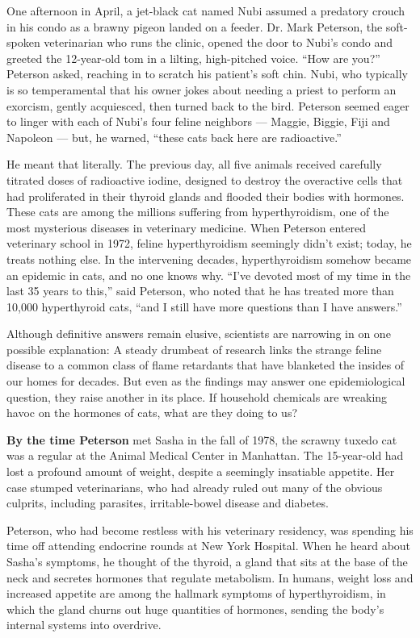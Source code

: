 One afternoon in April, a jet-black cat named Nubi assumed a predatory
crouch in his condo as a brawny pigeon landed on a feeder. Dr. Mark
Peterson, the soft-spoken veterinarian who runs the clinic, opened the
door to Nubi's condo and greeted the 12-year-old tom in a lilting,
high-pitched voice. ``How are you?'' Peterson asked, reaching in to
scratch his patient's soft chin. Nubi, who typically is so temperamental
that his owner jokes about needing a priest to perform an exorcism,
gently acquiesced, then turned back to the bird. Peterson seemed eager
to linger with each of Nubi's four feline neighbors --- Maggie, Biggie,
Fiji and Napoleon --- but, he warned, ``these cats back here are
radioactive.''

He meant that literally. The previous day, all five animals received
carefully titrated doses of radioactive iodine, designed to destroy the
overactive cells that had proliferated in their thyroid glands and
flooded their bodies with hormones. These cats are among the millions
suffering from hyperthyroidism, one of the most mysterious diseases in
veterinary medicine. When Peterson entered veterinary school in 1972,
feline hyperthyroidism seemingly didn't exist; today, he treats nothing
else. In the intervening decades, hyperthyroidism somehow became an
epidemic in cats, and no one knows why. ``I've devoted most of my time
in the last 35 years to this,'' said Peterson, who noted that he has
treated more than 10,000 hyperthyroid cats, ``and I still have more
questions than I have answers.''

Although definitive answers remain elusive, scientists are narrowing in
on one possible explanation: A steady drumbeat of research links the
strange feline disease to a common class of flame retardants that have
blanketed the insides of our homes for decades. But even as the findings
may answer one epidemiological question, they raise another in its
place. If household chemicals are wreaking havoc on the hormones of
cats, what are they doing to us?

\textbf{By the time Peterson} met Sasha in the fall of 1978, the scrawny
tuxedo cat was a regular at the Animal Medical Center in Manhattan. The
15-year-old had lost a profound amount of weight, despite a seemingly
insatiable appetite. Her case stumped veterinarians, who had already
ruled out many of the obvious culprits, including parasites,
irritable-bowel disease and diabetes.

Peterson, who had become restless with his veterinary residency, was
spending his time off attending endocrine rounds at New York Hospital.
When he heard about Sasha's symptoms, he thought of the thyroid, a gland
that sits at the base of the neck and secretes hormones that regulate
metabolism. In humans, weight loss and increased appetite are among the
hallmark symptoms of hyperthyroidism, in which the gland churns out huge
quantities of hormones, sending the body's internal systems into
overdrive.

